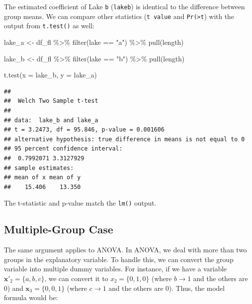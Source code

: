 \documentclass[
]{book}
\newenvironment{Shaded}{\begin{snugshade}}{\end{snugshade}}
\newcommand{\AttributeTok}[1]{\textcolor[rgb]{0.77,0.63,0.00}{#1}}
\newcommand{\FunctionTok}[1]{\textcolor[rgb]{0.00,0.00,0.00}{#1}}
\newcommand{\NormalTok}[1]{#1}
\newcommand{\OtherTok}[1]{\textcolor[rgb]{0.56,0.35,0.01}{#1}}
\newcommand{\SpecialCharTok}[1]{\textcolor[rgb]{0.00,0.00,0.00}{#1}}
\newcommand{\StringTok}[1]{\textcolor[rgb]{0.31,0.60,0.02}{#1}}
\begin{document}
The estimated coefficient of Lake \texttt{b} (\texttt{lakeb}) is identical to the difference between group means. We can compare other statistics (\texttt{t\ value} and \texttt{Pr(\textgreater{}\textbar{}t\textbar{}}) with the output from \texttt{t.test()} as well:

\begin{Shaded}
\begin{Highlighting}[]
\NormalTok{lake\_a }\OtherTok{\textless{}{-}}\NormalTok{ df\_fl }\SpecialCharTok{\%\textgreater{}\%} 
  \FunctionTok{filter}\NormalTok{(lake }\SpecialCharTok{==} \StringTok{"a"}\NormalTok{) }\SpecialCharTok{\%\textgreater{}\%} 
  \FunctionTok{pull}\NormalTok{(length)}

\NormalTok{lake\_b }\OtherTok{\textless{}{-}}\NormalTok{ df\_fl }\SpecialCharTok{\%\textgreater{}\%} 
  \FunctionTok{filter}\NormalTok{(lake }\SpecialCharTok{==} \StringTok{"b"}\NormalTok{) }\SpecialCharTok{\%\textgreater{}\%} 
  \FunctionTok{pull}\NormalTok{(length)}

\FunctionTok{t.test}\NormalTok{(}\AttributeTok{x =}\NormalTok{ lake\_b, }\AttributeTok{y =}\NormalTok{ lake\_a)}
\end{Highlighting}
\end{Shaded}

\begin{verbatim}
## 
##  Welch Two Sample t-test
## 
## data:  lake_b and lake_a
## t = 3.2473, df = 95.846, p-value = 0.001606
## alternative hypothesis: true difference in means is not equal to 0
## 95 percent confidence interval:
##  0.7992071 3.3127929
## sample estimates:
## mean of x mean of y 
##    15.406    13.350
\end{verbatim}

The t-statistic and p-value match the \texttt{lm()} output.

\hypertarget{multiple-group-case}{%
\subsection{Multiple-Group Case}\label{multiple-group-case}}

The same argument applies to ANOVA. In ANOVA, we deal with more than two groups in the explanatory variable. To handle this, we can convert the group variable into multiple dummy variables. For instance, if we have a variable \(\pmb{x'}_2 = \{a, b, c\}\), we can convert it to \(x_2 = \{0, 1, 0\}\) (where \(b \rightarrow 1\) and the others are \(0\)) and \(\pmb{x}_3 = \{0, 0, 1\}\) (where \(c \rightarrow 1\) and the others are \(0\)). Thus, the model formula would be:
\end{document}
